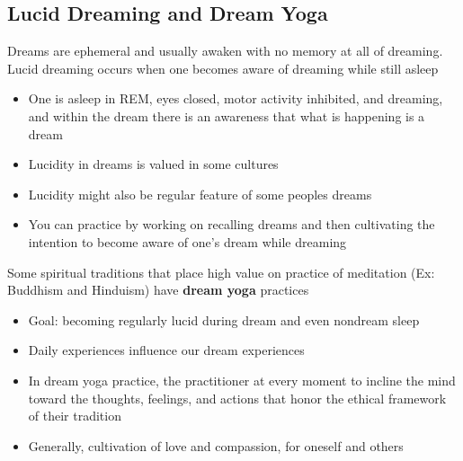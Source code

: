 \documentclass{article}
\begin{document}
\subsection{Lucid Dreaming and Dream Yoga}
Dreams are ephemeral and usually awaken with no memory at all of dreaming. \\
Lucid dreaming occurs when one becomes aware of dreaming while still asleep
\begin{itemize}
    \item One is asleep in REM, eyes closed, motor activity inhibited, and dreaming, and within the dream there is an awareness that what is happening is a dream
    \item Lucidity in dreams is valued in some cultures 
    \item Lucidity might also be regular feature of some peoples dreams
    \item You can practice by working on recalling dreams and then cultivating the intention to become aware of one's dream while dreaming
\end{itemize}

Some spiritual traditions that place high value on practice of meditation (Ex: Buddhism and Hinduism) have \textbf{dream yoga} practices
\begin{itemize}
    \item Goal: becoming regularly lucid during dream and even nondream sleep 
    \item Daily experiences influence our dream experiences
    \item In dream yoga practice, the practitioner at every moment to incline the mind toward the thoughts, feelings, and actions that honor the ethical framework of their tradition
    \item Generally, cultivation of love and compassion, for oneself and others
\end{itemize}
\end{document}

